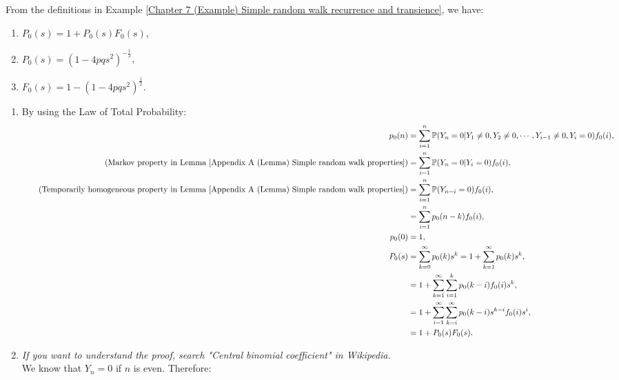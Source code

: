 \documentclass{huhtakm-template-book-v2}
\newcommand{\prob}{\mathbb{P}}
\begin{document}
    \begin{thm}
        \label{Chapter 7 (Theorem) Simple random walk particle return generating function}
        From the definitions in Example \ref{Chapter 7 (Example) Simple random walk recurrence and transience}, we have:
        \begin{enumerate}
            \item $P_{0}(s) = 1+P_{0}(s)F_{0}(s)$,
            \item $P_{0}(s) = (1-4pqs^{2})^{-\frac{1}{2}}$,
            \item $F_{0}(s) = 1-(1-4pqs^{2})^{\frac{1}{2}}$.
        \end{enumerate}
    \end{thm}
    \begin{proofing}
        \begin{enumerate}
            \item By using the Law of Total Probability:
            \begin{align*}
                p_{0}(n) &= \sum_{i = 1}^{n}\prob(Y_{n} = 0|Y_{1} \neq 0,Y_{2} \neq 0,\cdots,Y_{i-1} \neq 0,Y_{i} = 0)f_{0}(i),\\
                \tag{Markov property in Lemma \ref{Appendix A (Lemma) Simple random walk properties}}
                &= \sum_{i = 1}^{n}\prob(Y_{n} = 0|Y_{i} = 0)f_{0}(i),\\
                \tag{Temporarily homogeneous property in Lemma \ref{Appendix A (Lemma) Simple random walk properties}}
                &= \sum_{i = 1}^{n}\prob(Y_{n-i} = 0)f_{0}(i),\\
                &= \sum_{i = 1}^{n}p_{0}(n-k)f_{0}(i),\\
                p_{0}(0) &= 1,\\
                P_{0}(s) &= \sum_{k = 0}^{\infty}p_{0}(k)s^{k} = 1+\sum_{k = 1}^{\infty}p_{0}(k)s^{k},\\
                &= 1+\sum_{k = 1}^{\infty}\sum_{i = 1}^{k}p_{0}(k-i)f_{0}(i)s^{k},\\
                &= 1+\sum_{i = 1}^{\infty}\sum_{k = i}^{\infty}p_{0}(k-i)s^{k-i}f_{0}(i)s^{i},\\
                &= 1+P_{0}(s)F_{0}(s).
            \end{align*}
            \item \textit{If you want to understand the proof, search "Central binomial coefficient" in Wikipedia.}\\
            We know that $Y_{n} = 0$ if $n$ is even. Therefore:
            \begin{align*}

\end{align*}
\end{enumerate}
\end{proofing}
\end{document}
